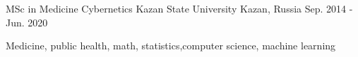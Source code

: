 

\begin{cventries}

  \cventry
    {MSc in Medicine Cybernetics} %
    {Kazan State University} %
    {Kazan, Russia} %
    {Sep. 2014 - Jun. 2020} %
    {
      \begin{cvitems} %
        \item {Medicine, public health, math, statistics,computer science, machine learning}
      \end{cvitems}
    }

\end{cventries}
